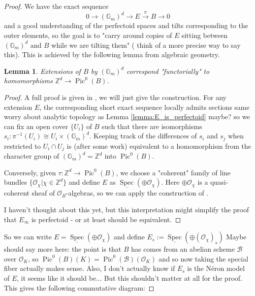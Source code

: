 \documentclass[11pt,oneside]{amsart}
\theoremstyle{theorem}
\newtheorem{lemma}[theorem]{Lemma}
\theoremstyle{definition}
\theoremstyle{remark}
\begin{document}
\begin{proof}
We have the exact sequence
$$0\rightarrow (\mathbb G_m)^d\rightarrow E\xrightarrow{\pi} B\rightarrow 0$$ and a good understanding of the perfectoid spaces and tilts corresponding to the outer elements, so the goal is to "carry around copies of $E$ sitting between $(\mathbb G_m)^d$ and $B$ while we are tilting them" ({\color{purple} think of a more precise way to say this}). This is achieved by the following lemma from algebraic geometry.

\begin{lemma}\label{lemma:ext_to_pic}
Extensions of $B$ by $(\mathbb G_m)^d$ correspond {\color{purple} "functorially"} to homomorphisms $\mathbb{Z}^d\rightarrow \operatorname{Pic}^0(B)$. 
\end{lemma}

\begin{proof}
A full proof is given in \cite[Lemma 6.7.2]{FvdP}, we will just give the construction. For any extension $E$, the corresponding short exact sequence locally admits sections {\color{purple} same worry about analytic topology as Lemma \ref{lemma:E_is_perfectoid} maybe?} so we can fix an open cover $\{ U_i\}$ of $B$ such that there are isomorphisms $s_i:\pi^{-1}(U_i)\cong  U_i\times (\mathbb G_m)^d$. Keeping track of the differences of $s_i$ and $s_j$ when restricted to $U_i\cap U_j$ is (after some work) equivalent to a homomorphism from the character group of $(\mathbb G_m)^d=\mathbb{Z}^d$ into $\operatorname{Pic}^0(B)$. 

Conversely, given $\tau:\mathbb{Z}^d\rightarrow\operatorname{Pic}^0(B)$, we choose a "coherent" family of line bundles $\{\mathcal O_\chi|\chi\in \mathbb{Z}^d\}$ and define $E$ as $\underline{\operatorname{Spec}}(\oplus \mathcal O_\chi)$. Here $\oplus \mathcal O_\chi$ is a quasi-coherent sheaf of $\mathcal O_B$-algebras, so we can apply the construction of \cite[Exercise II.5.17c]{Hartshorne}.

{\color{purple} I haven't thought about this yet, but this interpretation might simplify the proof that $E_\infty$ is perfectoid - or at least should be equivalent.}
\end{proof}

So we can write $E=\underline{\operatorname{Spec}}(\oplus \mathcal O_\chi)$ and define $E_s:=\underline{\operatorname{Spec}}(\oplus (\mathcal O_\chi)_s)$ {\color{purple} Maybe should say more here: the point is that $B$ has comes from an abelian scheme $\mathcal B$ over $\mathcal O_K$, so $\operatorname{Pic}^0(B)(K)=\operatorname{Pic}^0(\mathcal B)(\mathcal O_K)$ and so now taking the special fiber actually makes sense. Also, I don't actually know if $E_s$ is the N\'eron model of $E$, it seems like it should be... But this shouldn't matter at all for the proof.} This gives the following commutative diagram: 


\end{proof}
\end{document}
